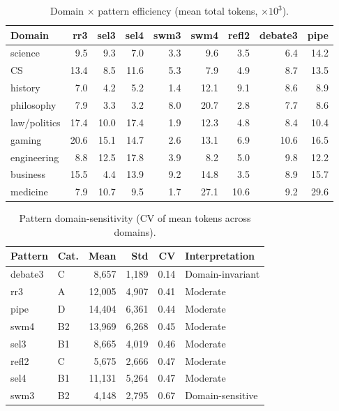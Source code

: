 \documentclass{article}
\begin{document}
\begin{table}[t]
\centering
\caption{Domain $\times$ pattern efficiency (mean total tokens, $\times 10^3$).}
\label{tab:domain_pattern}
{\small
\begin{tabular}{@{}lrrrrrrrr@{}}
\toprule
\textbf{Domain} & \textbf{rr3} & \textbf{sel3} & \textbf{sel4} & \textbf{swm3} & \textbf{swm4} & \textbf{refl2} & \textbf{debate3} & \textbf{pipe} \\
\midrule
science & 9.5 & 9.3 & 7.0 & 3.3 & 9.6 & 3.5 & 6.4 & 14.2 \\
CS & 13.4 & 8.5 & 11.6 & 5.3 & 7.9 & 4.9 & 8.7 & 13.5 \\
history & 7.0 & 4.2 & 5.2 & 1.4 & 12.1 & 9.1 & 8.6 & 8.9 \\
philosophy & 7.9 & 3.3 & 3.2 & 8.0 & 20.7 & 2.8 & 7.7 & 8.6 \\
law/politics & 17.4 & 10.0 & 17.4 & 1.9 & 12.3 & 4.8 & 8.4 & 10.4 \\
gaming & 20.6 & 15.1 & 14.7 & 2.6 & 13.1 & 6.9 & 10.6 & 16.5 \\
engineering & 8.8 & 12.5 & 17.8 & 3.9 & 8.2 & 5.0 & 9.8 & 12.2 \\
business & 15.5 & 4.4 & 13.9 & 9.2 & 14.8 & 3.5 & 8.9 & 15.7 \\
medicine & 7.9 & 10.7 & 9.5 & 1.7 & 27.1 & 10.6 & 9.2 & 29.6 \\
\bottomrule
\end{tabular}
}
\end{table}

\begin{table}[H]
\centering
\caption{Pattern domain-sensitivity (CV of mean tokens across domains).}
\label{tab:domain_sensitivity}
{\small
\begin{tabular}{@{}llrrrl@{}}
\toprule
\textbf{Pattern} & \textbf{Cat.} & \textbf{Mean} & \textbf{Std} & \textbf{CV} & \textbf{Interpretation} \\
\midrule
debate3 & C & 8,657 & 1,189 & 0.14 & Domain-invariant \\
rr3 & A & 12,005 & 4,907 & 0.41 & Moderate \\
pipe & D & 14,404 & 6,361 & 0.44 & Moderate \\
swm4 & B2 & 13,969 & 6,268 & 0.45 & Moderate \\
sel3 & B1 & 8,665 & 4,019 & 0.46 & Moderate \\
refl2 & C & 5,675 & 2,666 & 0.47 & Moderate \\
sel4 & B1 & 11,131 & 5,264 & 0.47 & Moderate \\
swm3 & B2 & 4,148 & 2,795 & 0.67 & Domain-sensitive \\
\bottomrule
\end{tabular}
}
\end{table}
\end{document}
